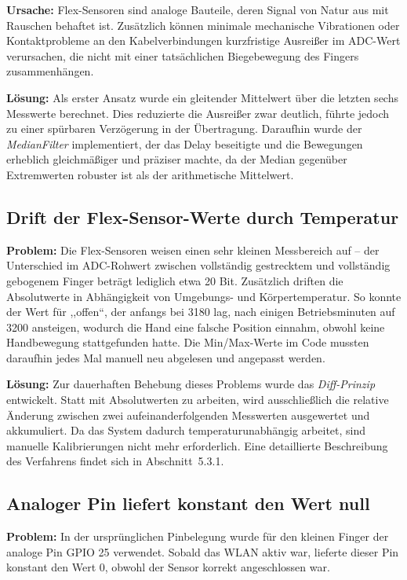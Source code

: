 \documentclass[12pt,a4paper]{article}
\begin{document}
\textbf{Ursache:} Flex-Sensoren sind analoge Bauteile, deren Signal von Natur aus mit Rauschen behaftet ist. Zusätzlich können minimale mechanische Vibrationen oder Kontaktprobleme an den Kabelverbindungen kurzfristige Ausreißer im ADC-Wert verursachen, die nicht mit einer tatsächlichen Biegebewegung des Fingers zusammenhängen.

\textbf{Lösung:} Als erster Ansatz wurde ein gleitender Mittelwert über die letzten sechs Messwerte berechnet. Dies reduzierte die Ausreißer zwar deutlich, führte jedoch zu einer spürbaren Verzögerung in der Übertragung. Daraufhin wurde der \textit{MedianFilter} implementiert, der das Delay beseitigte und die Bewegungen erheblich gleichmäßiger und präziser machte, da der Median gegenüber Extremwerten robuster ist als der arithmetische Mittelwert.

\subsection{Drift der Flex-Sensor-Werte durch Temperatur}
\label{sec:drift}

\textbf{Problem:} Die Flex-Sensoren weisen einen sehr kleinen Messbereich auf -- der Unterschied im ADC-Rohwert zwischen vollständig gestrecktem und vollständig gebogenem Finger beträgt lediglich etwa 20 Bit. Zusätzlich driften die Absolutwerte in Abhängigkeit von Umgebungs- und Körpertemperatur. So konnte der Wert für ,,offen``, der anfangs bei 3180 lag, nach einigen Betriebsminuten auf 3200 ansteigen, wodurch die Hand eine falsche Position einnahm, obwohl keine Handbewegung stattgefunden hatte. Die Min/Max-Werte im Code mussten daraufhin jedes Mal manuell neu abgelesen und angepasst werden.

\textbf{Lösung:} Zur dauerhaften Behebung dieses Problems wurde das \textit{Diff-Prinzip} entwickelt. Statt mit Absolutwerten zu arbeiten, wird ausschließlich die relative Änderung zwischen zwei aufeinanderfolgenden Messwerten ausgewertet und akkumuliert. Da das System dadurch temperaturunabhängig arbeitet, sind manuelle Kalibrierungen nicht mehr erforderlich. Eine detaillierte Beschreibung des Verfahrens findet sich in Abschnitt~5.3.1.

\newpage

\subsection{Analoger Pin liefert konstant den Wert null}

\textbf{Problem:} In der ursprünglichen Pinbelegung wurde für den kleinen Finger der analoge Pin GPIO 25 verwendet. Sobald das WLAN aktiv war, lieferte dieser Pin konstant den Wert 0, obwohl der Sensor korrekt angeschlossen war.
\end{document}
